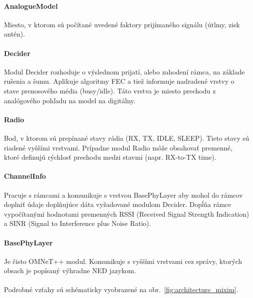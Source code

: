 \paragraph{AnalogueModel}
\indent Miesto, v ktorom sú počítané uvedené faktory prijímaného signálu (útlmy, zisk antén).

\paragraph{Decider}
\indent Modul \ttfamily Decider \rmfamily rozhoduje o výslednom prijatí, alebo zahodení rámca, na základe rušenia a šumu. Aplikuje algoritmy FEC a tiež informuje nadradené vrstvy o stave prenosového média (busy/idle). Táto vrstva je miesto prechodu z analógového pohľadu na model na digitálny.

\paragraph{Radio}
\indent Bod, v ktorom sú prepínané stavy rádia (RX, TX, IDLE, SLEEP). Tieto stavy sú riadené vyššími vrstvami. Prípadne modul \ttfamily Radio \rmfamily môže obsahovať premenné, ktoré definujú rýchlosť prechodu medzi stavmi (napr. RX-to-TX time).

\paragraph{ChannelInfo}
\indent Pracuje s rámcami a komunikuje s vrstvou \ttfamily BasePhyLayer \rmfamily aby mohol do rámcov doplniť údaje doplňujúce dáta vyžadované modulom \ttfamily Decider\rmfamily. Dopĺňa rámce vypočítanými hodnotami premenných RSSI (Received Signal Strength Indication) a SINR (Signal to Interference plus Noise Ratio).

\paragraph{BasePhyLayer}
\indent Je čisto OMNeT++ modul. Komunikuje s vyššími vrstvami cez správy, ktorých obsach je popísaný výhradne NED jazykom.\\ \\
\indent Podrobné vzťahy sú schématicky vyobrazené na obr.~\ref{fig:architecture_mixim}.\\


